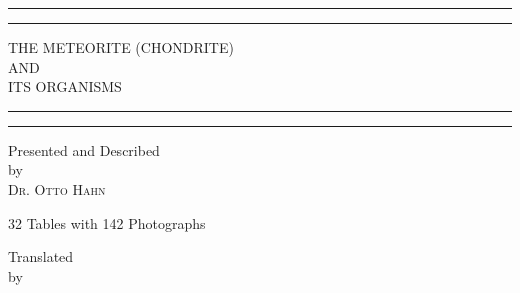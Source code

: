 \documentclass[a4paper, 12pt, oneside]{article}
\begin{document}
\begin{titlepage} %
	\centering %
	\scshape %

	
	\rule{\textwidth}{1.6pt}\vspace*{-\baselineskip}\vspace*{2pt} %
	\rule{\textwidth}{0.4pt} %
	
	\vspace{0.75\baselineskip} %
	
	{\LARGE THE METEORITE (CHONDRITE)\\ AND\\ ITS ORGANISMS\\} %
	
	\vspace{0.75\baselineskip} %
	
	\rule{\textwidth}{0.4pt}\vspace*{-\baselineskip}\vspace{3.2pt} %
	\rule{\textwidth}{1.6pt} %
	
	\vspace{1\baselineskip} %
	
	
	{Presented and Described\\ by\\ \scshape\Large Dr. Otto Hahn\\} %
	
	\vspace*{1\baselineskip} %
	
    {\small 32 Tables with 142 Photographs} %
    
	
	\vspace{1\baselineskip} %

	Translated\\ by\\
	

\end{titlepage}
\end{document}
